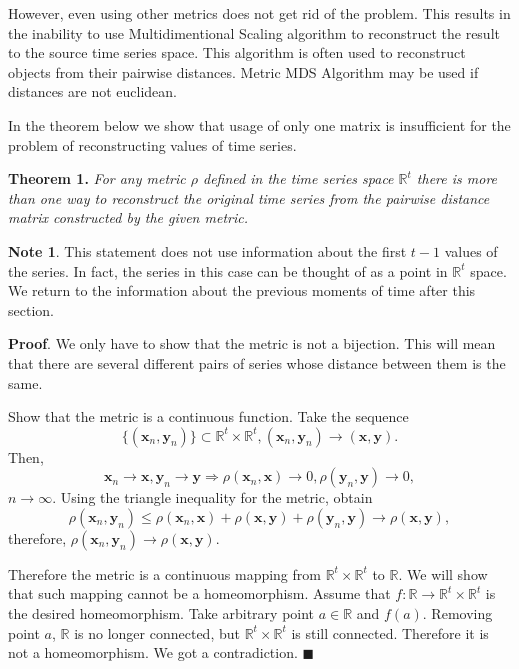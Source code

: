 \documentclass[12pt]{article}
\begin{document}
However, even using other metrics does not get rid of the problem. This results in the inability to use Multidimentional Scaling algorithm to reconstruct the result to the source time series space. This algorithm is often used to reconstruct objects from their pairwise distances. Metric MDS Algorithm may be used if distances are not euclidean.

In the theorem below we show that usage of only one matrix is insufficient for the problem of reconstructing values of time series.

\textbf{Theorem 1.} \emph{For any metric $\rho$ defined in the time series space $\mathbb{R}^t$ there is more than one way to reconstruct the original time series from the pairwise distance matrix constructed by the given metric.}	

\textbf{Note 1}. This statement does not use information about the first $t-1$ values of the series. In fact, the series in this case can be thought of as a point in $\mathbb{R}^t$ space. We return to the information about the previous moments of time after this section.

\textbf{Proof}. We only have to show that the metric is not a bijection. This will mean that there are several different pairs of series whose distance between them is the same.

Show that the metric is a continuous function. Take the sequence \[\{(\mathbf{x}_n, \mathbf{y}_n)\} \subset \mathbb{R}^t \times \mathbb{R}^t, (\mathbf{x}_n, \mathbf{y}_n) \to (\mathbf{x}, \mathbf{y}).\] Then, \[\mathbf{x}_n\to \mathbf{x}, \mathbf{y}_n\to \mathbf{y} \Rightarrow \rho(\mathbf{x}_n,\mathbf{x})\to 0 ,\rho(\mathbf{y}_n,\mathbf{y})\to 0,\] $n \to \infty.$ Using the triangle inequality for the metric, obtain \[\rho(\mathbf{x}_n,\mathbf{y}_n)\leqslant \rho(\mathbf{x}_n,\mathbf{x})+\rho(\mathbf{x},\mathbf{y})+\rho(\mathbf{y}_n,\mathbf{y})\to \rho(\mathbf{x},\mathbf{y}),\] therefore, $\rho(\mathbf{x}_n,\mathbf{y}_n)\to \rho(\mathbf{x},\mathbf{y})$.

Therefore the metric is a continuous mapping from $\mathbb{R}^t \times \mathbb{R}^t$ to $\mathbb{R}$. We will show that such mapping cannot be a homeomorphism. Assume that $f: \mathbb{R} \to \mathbb{R}^t \times \mathbb{R}^t$ is the desired homeomorphism. Take arbitrary point $a \in \mathbb{R}$ and $f(a)$. Removing point $a$, $\mathbb{R}$ is no longer connected, but $\mathbb{R}^t \times \mathbb{R}^t$ is still connected. Therefore it is not a homeomorphism. We got a contradiction.
$\blacksquare$
\end{document}

